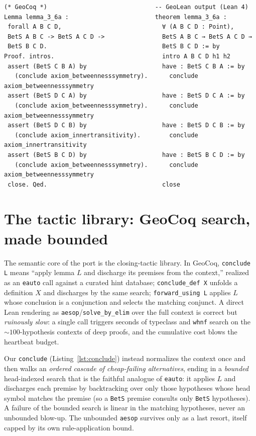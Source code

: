\documentclass{article}
\begin{document}
\begin{lstlisting}[caption={\texttt{lemma\_3\_6a} (Coq, left) and its GeoLean translation (Lean, right). The proof structure is copied verbatim; only the closing tactics carry semantics.},label={lst:worked},float=t]
(* GeoCoq *)                              -- GeoLean output (Lean 4)
Lemma lemma_3_6a :                        theorem lemma_3_6a :
 forall A B C D,                            ∀ (A B C D : Point),
 BetS A B C -> BetS A C D ->                BetS A B C → BetS A C D →
 BetS B C D.                                BetS B C D := by
Proof. intros.                              intro A B C D h1 h2
 assert (BetS C B A) by                     have : BetS C B A := by
   (conclude axiom_betweennesssymmetry).      conclude axiom_betweennesssymmetry
 assert (BetS D C A) by                     have : BetS D C A := by
   (conclude axiom_betweennesssymmetry).      conclude axiom_betweennesssymmetry
 assert (BetS D C B) by                     have : BetS D C B := by
   (conclude axiom_innertransitivity).        conclude axiom_innertransitivity
 assert (BetS B C D) by                     have : BetS B C D := by
   (conclude axiom_betweennesssymmetry).      conclude axiom_betweennesssymmetry
 close. Qed.                                close
\end{lstlisting}

\section{The tactic library: GeoCoq search, made bounded}
\label{sec:tactics}

The semantic core of the port is the closing-tactic library. In GeoCoq, \texttt{conclude L}
means ``apply lemma $L$ and discharge its premises from the context,'' realized as an
\texttt{eauto} call against a curated hint database; \texttt{conclude\_def X} unfolds a
definition $X$ and discharges by the same search; \texttt{forward\_using L} applies $L$ whose
conclusion is a conjunction and selects the matching conjunct. A direct Lean rendering as
\texttt{aesop}/\texttt{solve\_by\_elim} over the full context is correct but \emph{ruinously
slow}: a single call triggers seconds of typeclass and \texttt{whnf} search on the
${\sim}100$-hypothesis contexts of deep proofs, and the cumulative cost blows the heartbeat
budget.

Our \texttt{conclude} (Listing~\ref{lst:conclude}) instead normalizes the context once and then
walks an \emph{ordered cascade of cheap-failing alternatives}, ending in a \emph{bounded}
head-indexed search that is the faithful analogue of \texttt{eauto}: it applies $L$ and discharges
each premise by backtracking over only those hypotheses whose head symbol matches the premise
(so a \texttt{BetS} premise consults only \texttt{BetS} hypotheses). A failure of the bounded
search is linear in the matching hypotheses, never an unbounded blow-up. The unbounded
\texttt{aesop} survives only as a last resort, itself capped by its own rule-application bound.
\end{document}
